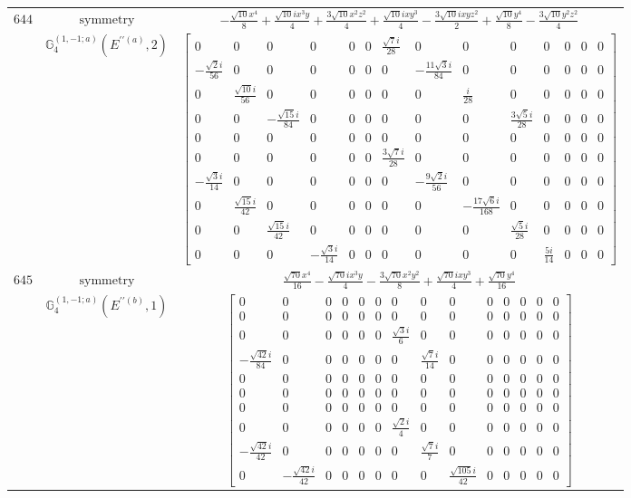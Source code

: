 \documentclass[fleqn,8pt,landscape]{jsarticle}
\begin{document}
\begin{longtable}{ccc}
$ 644 $ & $ \text{symmetry} $ & $ - \frac{\sqrt{10} x^{4}}{8} + \frac{\sqrt{10} i x^{3} y}{4} + \frac{3 \sqrt{10} x^{2} z^{2}}{4} + \frac{\sqrt{10} i x y^{3}}{4} - \frac{3 \sqrt{10} i x y z^{2}}{2} + \frac{\sqrt{10} y^{4}}{8} - \frac{3 \sqrt{10} y^{2} z^{2}}{4} $ \\
$  $ & $ \mathbb{G}_{4}^{(1,-1;a)}(E^{\prime\prime(a)},2) $ & $ \begin{bmatrix} 0 & 0 & 0 & 0 & 0 & 0 & \frac{\sqrt{7} i}{28} & 0 & 0 & 0 & 0 & 0 & 0 & 0 \\ - \frac{\sqrt{2} i}{56} & 0 & 0 & 0 & 0 & 0 & 0 & - \frac{11 \sqrt{3} i}{84} & 0 & 0 & 0 & 0 & 0 & 0 \\ 0 & \frac{\sqrt{10} i}{56} & 0 & 0 & 0 & 0 & 0 & 0 & \frac{i}{28} & 0 & 0 & 0 & 0 & 0 \\ 0 & 0 & - \frac{\sqrt{15} i}{84} & 0 & 0 & 0 & 0 & 0 & 0 & \frac{3 \sqrt{5} i}{28} & 0 & 0 & 0 & 0 \\ 0 & 0 & 0 & 0 & 0 & 0 & 0 & 0 & 0 & 0 & 0 & 0 & 0 & 0 \\ 0 & 0 & 0 & 0 & 0 & 0 & \frac{3 \sqrt{7} i}{28} & 0 & 0 & 0 & 0 & 0 & 0 & 0 \\ - \frac{\sqrt{3} i}{14} & 0 & 0 & 0 & 0 & 0 & 0 & - \frac{9 \sqrt{2} i}{56} & 0 & 0 & 0 & 0 & 0 & 0 \\ 0 & \frac{\sqrt{15} i}{42} & 0 & 0 & 0 & 0 & 0 & 0 & - \frac{17 \sqrt{6} i}{168} & 0 & 0 & 0 & 0 & 0 \\ 0 & 0 & \frac{\sqrt{15} i}{42} & 0 & 0 & 0 & 0 & 0 & 0 & \frac{\sqrt{5} i}{28} & 0 & 0 & 0 & 0 \\ 0 & 0 & 0 & - \frac{\sqrt{3} i}{14} & 0 & 0 & 0 & 0 & 0 & 0 & \frac{5 i}{14} & 0 & 0 & 0 \end{bmatrix} $ \\ \hline
$ 645 $ & $ \text{symmetry} $ & $ \frac{\sqrt{70} x^{4}}{16} - \frac{\sqrt{70} i x^{3} y}{4} - \frac{3 \sqrt{70} x^{2} y^{2}}{8} + \frac{\sqrt{70} i x y^{3}}{4} + \frac{\sqrt{70} y^{4}}{16} $ \\
$  $ & $ \mathbb{G}_{4}^{(1,-1;a)}(E^{\prime\prime(b)},1) $ & $ \begin{bmatrix} 0 & 0 & 0 & 0 & 0 & 0 & 0 & 0 & 0 & 0 & 0 & 0 & 0 & 0 \\ 0 & 0 & 0 & 0 & 0 & 0 & 0 & 0 & 0 & 0 & 0 & 0 & 0 & 0 \\ 0 & 0 & 0 & 0 & 0 & 0 & \frac{\sqrt{3} i}{6} & 0 & 0 & 0 & 0 & 0 & 0 & 0 \\ - \frac{\sqrt{42} i}{84} & 0 & 0 & 0 & 0 & 0 & 0 & \frac{\sqrt{7} i}{14} & 0 & 0 & 0 & 0 & 0 & 0 \\ 0 & 0 & 0 & 0 & 0 & 0 & 0 & 0 & 0 & 0 & 0 & 0 & 0 & 0 \\ 0 & 0 & 0 & 0 & 0 & 0 & 0 & 0 & 0 & 0 & 0 & 0 & 0 & 0 \\ 0 & 0 & 0 & 0 & 0 & 0 & 0 & 0 & 0 & 0 & 0 & 0 & 0 & 0 \\ 0 & 0 & 0 & 0 & 0 & 0 & \frac{\sqrt{2} i}{4} & 0 & 0 & 0 & 0 & 0 & 0 & 0 \\ - \frac{\sqrt{42} i}{42} & 0 & 0 & 0 & 0 & 0 & 0 & \frac{\sqrt{7} i}{7} & 0 & 0 & 0 & 0 & 0 & 0 \\ 0 & - \frac{\sqrt{42} i}{42} & 0 & 0 & 0 & 0 & 0 & 0 & \frac{\sqrt{105} i}{42} & 0 & 0 & 0 & 0 & 0 \end{bmatrix} $ \\ \hline

\end{longtable}
\end{document}
